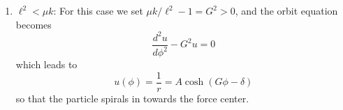 \documentclass[usletter, 12pt]{article}
\begin{document}
\begin{enumerate}[leftmargin=0em, label=\textbf{\arabic*}.]
\begin{enumerate}[leftmargin=2em, label=(\textbf{\alph*})]
  \item $\ell^2<\mu k$:
   \noindent For this case we set $\mu k/\ell^2-1=G^2>0$, and the orbit equation
   becomes
   \begin{equation}
     \frac{d^2u}{d\phi^2} - G^2u = 0
   \end{equation}
   which leads to
   \begin{equation}
     u(\phi) = \frac{1}{r} = A\cosh(G\phi-\delta)
   \end{equation}
   so that the particle spirals in towards the force center.
  \end{enumerate}
  
\end{enumerate}
\end{document}
